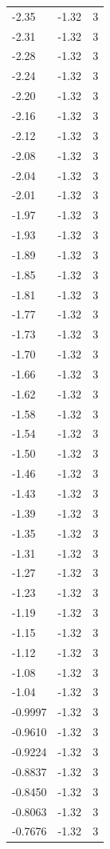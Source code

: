 \begin{longtable}{lrr}
  -2.35 & -1.32 & 3 \\
  -2.31 & -1.32 & 3 \\
  -2.28 & -1.32 & 3 \\
  -2.24 & -1.32 & 3 \\
  -2.20 & -1.32 & 3 \\
  -2.16 & -1.32 & 3 \\
  -2.12 & -1.32 & 3 \\
  -2.08 & -1.32 & 3 \\
  -2.04 & -1.32 & 3 \\
  -2.01 & -1.32 & 3 \\
  -1.97 & -1.32 & 3 \\
  -1.93 & -1.32 & 3 \\
  -1.89 & -1.32 & 3 \\
  -1.85 & -1.32 & 3 \\
  -1.81 & -1.32 & 3 \\
  -1.77 & -1.32 & 3 \\
  -1.73 & -1.32 & 3 \\
  -1.70 & -1.32 & 3 \\
  -1.66 & -1.32 & 3 \\
  -1.62 & -1.32 & 3 \\
  -1.58 & -1.32 & 3 \\
  -1.54 & -1.32 & 3 \\
  -1.50 & -1.32 & 3 \\
  -1.46 & -1.32 & 3 \\
  -1.43 & -1.32 & 3 \\
  -1.39 & -1.32 & 3 \\
  -1.35 & -1.32 & 3 \\
  -1.31 & -1.32 & 3 \\
  -1.27 & -1.32 & 3 \\
  -1.23 & -1.32 & 3 \\
  -1.19 & -1.32 & 3 \\
  -1.15 & -1.32 & 3 \\
  -1.12 & -1.32 & 3 \\
  -1.08 & -1.32 & 3 \\
  -1.04 & -1.32 & 3 \\
  -0.9997 & -1.32 & 3 \\
  -0.9610 & -1.32 & 3 \\
  -0.9224 & -1.32 & 3 \\
  -0.8837 & -1.32 & 3 \\
  -0.8450 & -1.32 & 3 \\
  -0.8063 & -1.32 & 3 \\
  -0.7676 & -1.32 & 3 \\

\end{longtable}
